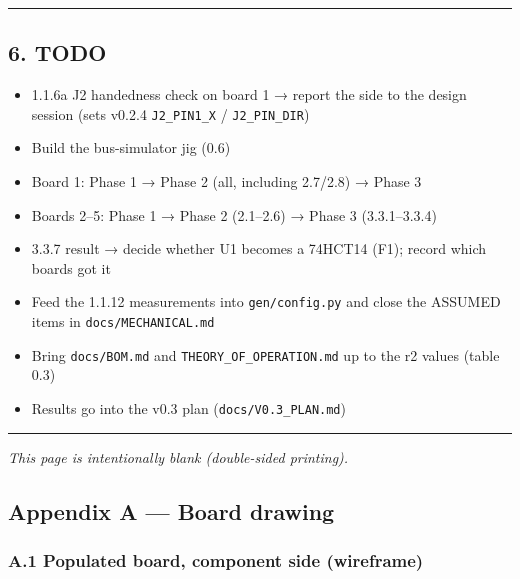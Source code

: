 \documentclass[
  10pt,
  twoside]{article}
\makeatletter
\providecommand{\tightlist}{%
  \setlength{\itemsep}{0pt}\setlength{\parskip}{0pt}}
\renewcommand{\cleardoublepage}{\clearpage\if@twoside\ifodd\c@page\else
  \null\vfill{\centering\small\textit{This page is intentionally blank (double-sided printing).}\par}\vfill\newpage\fi\fi}
\renewcommand{\arraystretch}{1.25}
\makeatother
\begin{document}
\begin{center}\rule{0.5\linewidth}{0.5pt}\end{center}

\renewcommand{\arraystretch}{1.25}
\hypertarget{todo}{%
\subsection{6. TODO}\label{todo}}

\begin{itemize}
\tightlist
\item[$\square$]
  \textcolor[HTML]{0040A0}{1.1.6a J2 handedness check on
  board 1 → report the side to the design session (sets
  v0.2.4 \texttt{J2\_PIN1\_X} / \texttt{J2\_PIN\_DIR})}
\item[$\square$]
  Build the bus-simulator jig (0.6)
\item[$\square$]
  Board 1: Phase 1 → Phase 2 (all, including 2.7/2.8) →
  Phase 3
\item[$\square$]
  Boards 2--5: Phase 1 → Phase 2 (2.1--2.6) → Phase 3
  (3.3.1--3.3.4)
\item[$\square$]
  \textcolor[HTML]{0040A0}{3.3.7 result → decide whether U1
  becomes a 74HCT14 (F1); record which boards got it}
\item[$\square$]
  Feed the 1.1.12 measurements into \texttt{gen/config.py}
  and close the ASSUMED items in \texttt{docs/MECHANICAL.md}
\item[$\square$]
  Bring \texttt{docs/BOM.md} and
  \texttt{THEORY\_OF\_OPERATION.md} up to the r2 values
  (table 0.3)
\item[$\square$]
  Results go into the v0.3 plan
  (\texttt{docs/V0.3\_PLAN.md})
\end{itemize}

\begin{center}\rule{0.5\linewidth}{0.5pt}\end{center}

\cleardoublepage
\hypertarget{appendix-a-board-drawing}{%
\subsection{Appendix A --- Board
drawing}\label{appendix-a-board-drawing}}

\hypertarget{a.1-populated-board-component-side-wireframe}{%
\subsubsection{A.1 Populated board, component side
(wireframe)}\label{a.1-populated-board-component-side-wireframe}}
\end{document}
